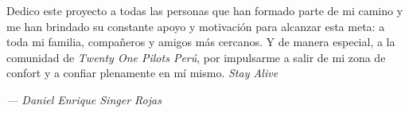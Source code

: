 Dedico este proyecto a todas las personas que han formado parte de mi camino y 
me han brindado su constante apoyo y motivación para alcanzar esta meta: 
a toda mi familia, compañeros y amigos más cercanos. 
Y de manera especial, a la comunidad de \textit{Twenty One Pilots Perú}, 
por impulsarme a salir de mi zona de confort y a confiar plenamente en mí mismo. 
\textit{Stay Alive}

\begin{flushright}
    \small\textit{--- Daniel Enrique Singer Rojas}
\end{flushright}
